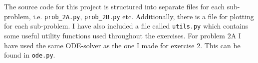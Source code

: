 The source code for this project is structured into separate files for each sub-problem, i.e. \lstinline|prob_2A.py|, \lstinline|prob_2B.py| etc. Additionally, there is a file for plotting for each sub-problem. I have also included a file called \lstinline|utils.py| which contains some useful utility functions used throughout the exercises. For problem $2$A I have used the same ODE-solver as the one I made for exercise $2$. This can be found in \lstinline|ode.py|.

